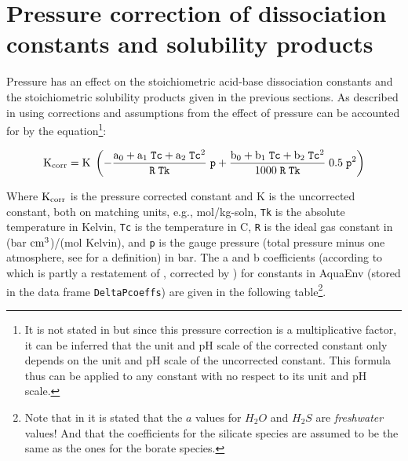 \documentclass[a4paper]{article}
\begin{document}
\section{Pressure correction of dissociation constants and solubility products}
Pressure has an effect on the stoichiometric acid-base dissociation constants  and the stoichiometric solubility products given in the  previous sections. As described in \citet[p. 675]{Millero1995} using corrections and assumptions from \citet[p. A-7]{Lewis1998} the effect of pressure can be accounted for by the equation\footnote{It is not stated in \citet{Millero1995} but since this pressure correction is a multiplicative factor, it can be inferred that the unit and pH scale of the corrected constant only depends on the unit and pH scale of the uncorrected constant. This formula thus can be applied to any constant with no respect to its unit and pH scale.}:

\begin{equation}
\rm K_{corr} = K \; \left(- \frac{a_0 + a_1 \; \mbox{\texttt{Tc}} + a_2 \; \mbox{\texttt{Tc}}^2}{\mbox{\texttt{R}}\;\mbox{\texttt{Tk}}} \; \mbox{\texttt{p}} + \frac{b_0 + b_1 \; \mbox{\texttt{Tc}} + b_2 \; \mbox{\texttt{Tc}}^2}{1000\;\mbox{\texttt{R}}\;\mbox{\texttt{Tk}}} \; 0.5 \; \mbox{\texttt{p}}^2\right) 
\end{equation}

\noindent
Where $\rm K_{corr}$ is the pressure corrected constant and K is the uncorrected constant, both on matching units, e.g., mol/kg-soln, \texttt{Tk} is the absolute temperature in Kelvin, \texttt{Tc} is the temperature in \textdegree$ $C, \texttt{R} is the ideal gas constant in (bar $\rm cm^3$)/(mol Kelvin), and \texttt{p} is the gauge pressure (total pressure minus one atmosphere, see \cite{Feistel2008} for a definition) in bar. The a and b coefficients (according to \citet{Millero1995} which is partly a restatement of \citet{Millero1979}, corrected by \citet{Lewis1998}) for constants in \textsf{AquaEnv} (stored in the data frame \texttt{DeltaPcoeffs}) are given in the following table\footnote{Note that in \citet{Lewis1998} it is stated that the $a$ values for $H_2O$ and $H_2S$ are \textit{freshwater} values! And that the coefficients for the silicate species are assumed to be the same as the ones for the borate species.}.
\end{document}
